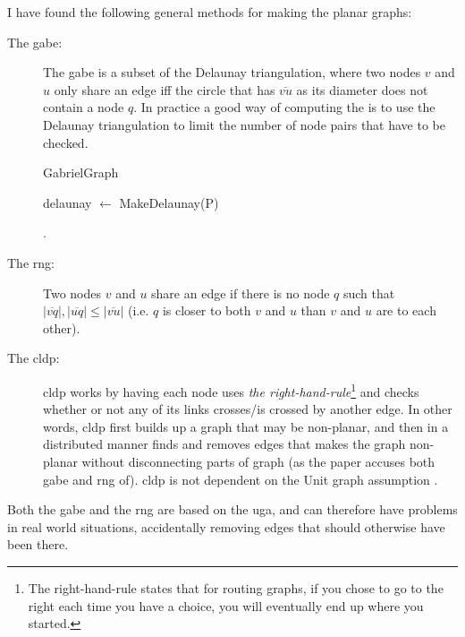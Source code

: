 I have found the following general methods for making the planar graphs:
\begin{description}
\item[The \ac{gabe}:] The \ac{gabe} is a subset of the Delaunay triangulation, where two nodes $v$ and $u$ only share an edge iff the circle that has $\overline{vu}$ as its diameter does not contain a node $q$. In practice a good way of computing the  is to use the Delaunay triangulation to limit the number of node pairs that have to be checked.
\begin{algorithmic}[H]
  \caption{GabrielGraph}
  \dontprintsemicolon
  delaunay $\gets$ MakeDelaunay(P) \;
\STATE 
\end{algorithmic} 

\cite{gpsr, gopher}. 
\item[The \ac{rng}:] Two nodes $v$ and $u$ share an edge if there is no node $q$ such that $|\overline{vq}|, |\overline{uq}| \leq |\overline{vu}|$ (i.e. $q$ is closer to both $v$ and $u$ than $v$ and $u$ are to each other). \cite{gpsr, RNG}
\item[The \ac{cldp}:] \ac{cldp} works by having each node uses \emph{the right-hand-rule}\label{right-hand rule}\footnote{The right-hand-rule states that for routing graphs, if you chose to go to the right each time you have a choice, you will eventually end up where you started.} and checks whether or not any of its links crosses/is crossed by another edge. In other words, \ac{cldp} first builds up a graph that may be non-planar, and then in a distributed manner finds and removes edges that makes the graph non-planar without disconnecting parts of graph (as the paper accuses both \ac{gabe} and \ac{rng} of). \ac{cldp} is not dependent on the Unit graph assumption \cite{practical}. 
\end{description}

Both the \ac{gabe} and the \ac{rng} are based on the \ac{uga}, and can therefore have problems in real world situations, accidentally removing edges that should otherwise have been there\cite{practical}.


